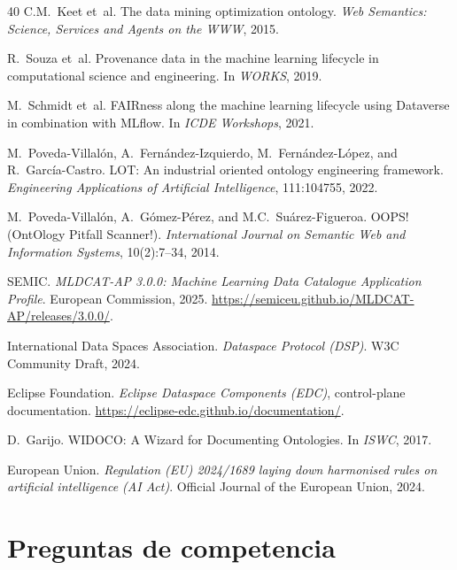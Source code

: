 \documentclass[11pt,a4paper]{article}
\begin{document}
\begin{thebibliography}{40}
 C.M.~Keet et~al. The data mining optimization ontology. \emph{Web Semantics: Science, Services and Agents on the WWW}, 2015.

 R.~Souza et~al. Provenance data in the machine learning lifecycle in computational science and engineering. In \emph{WORKS}, 2019.

 M.~Schmidt et~al. FAIRness along the machine learning lifecycle using Dataverse in combination with MLflow. In \emph{ICDE Workshops}, 2021.

 M.~Poveda-Villalón, A.~Fernández-Izquierdo, M.~Fernández-López, and R.~García-Castro. LOT: An industrial oriented ontology engineering framework. \emph{Engineering Applications of Artificial Intelligence}, 111:104755, 2022.

 M.~Poveda-Villalón, A.~Gómez-Pérez, and M.C.~Suárez-Figueroa. OOPS! (OntOlogy Pitfall Scanner!). \emph{International Journal on Semantic Web and Information Systems}, 10(2):7--34, 2014.

 SEMIC. \emph{MLDCAT-AP 3.0.0: Machine Learning Data Catalogue Application Profile}. European Commission, 2025. \url{https://semiceu.github.io/MLDCAT-AP/releases/3.0.0/}.

 International Data Spaces Association. \emph{Dataspace Protocol (DSP)}. W3C Community Draft, 2024.

 Eclipse Foundation. \emph{Eclipse Dataspace Components (EDC)}, control-plane documentation. \url{https://eclipse-edc.github.io/documentation/}.

 D.~Garijo. WIDOCO: A Wizard for Documenting Ontologies. In \emph{ISWC}, 2017.

 European Union. \emph{Regulation (EU) 2024/1689 laying down harmonised rules on artificial intelligence (AI Act)}. Official Journal of the European Union, 2024.

\end{thebibliography}

\appendix

\section{Preguntas de competencia}\label{app:cqs}
\end{document}
